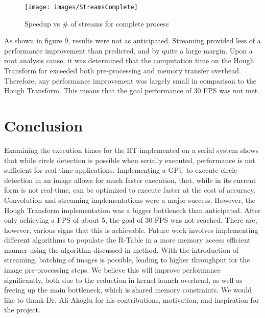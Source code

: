 \documentclass[conference]{IEEEtran}
\begin{document}
\begin{figure}[H]
\centering
\texttt{[image: images/StreamsComplete]}\caption{Speedup vs \# of streams for complete process}\label{figure:streamComplete}
\end{figure}

As shown in figure 9, results were not as anticipated. Streaming provided less of a performance improvement than predicted, and by quite a large margin. Upon a root analysis cause, it was determined that the computation time on the Hough Transform far exceeded both pre-processing and memory transfer overhead. Therefore, any performance improvement was largely small in comparison to the Hough Transform. This means that the goal performance of 30 FPS was not met.

\section{Conclusion}
Examining the execution times for the HT implemented on a serial system shows that while circle detection is possible when serially executed, performance is not sufficient for real time applications.
Implementing a GPU to execute circle detection in an image allows for much faster execution, that, while in its current form is not real-time, can be optimized to execute faster at the cost of accuracy. Convolution and streaming implementations were a major success. However, the Hough Transform implementation was a bigger bottleneck than anticipated. After only achieving a FPS of about 5, the goal of 30 FPS was not reached. There are, however, various signs that this is achievable.
Future work involves implementing different algorithms to populate the R-Table in a more memory access efficient manner using the algorithm discussed in method. 
With the introduction of streaming, batching of images is possible, leading to higher throughput for the image pre-processing steps. We believe this will improve performance significantly, both due to the reduction in kernel launch overhead, as well as freeing up the main bottleneck, which is shared memory constraints.
We would like to thank Dr. Ali Akoglu for his contributions, motivation, and inspiration for the project.




\end{document}
